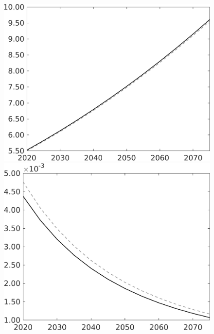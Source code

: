 \documentclass[12pt]{article}
\begin{document}
\begin{figure}[h!!]
\begin{minipage}[]{0.32\textwidth}
	\end{minipage}	
	\begin{minipage}[]{0.32\textwidth}
		\includegraphics[width=1\textwidth]{../../codding_model/own_basedOnFried/optimalPol_010922_revision/figures/all_13Sept22/CompTaul_Equlab_LFBAU_Reg0_pgpftf_spillover0_nsk0_xgr0_knspil1_sep1_countec0_GovRev0_etaa0.79_lgd0.png}
	\end{minipage}	
	\begin{minipage}[]{0.32\textwidth}
		\includegraphics[width=1\textwidth]{../../codding_model/own_basedOnFried/optimalPol_010922_revision/figures/all_13Sept22/CompTaul_Equlab_LFBAU_Reg0_Lf_spillover0_nsk0_xgr0_knspil1_sep1_countec0_GovRev0_etaa0.79_lgd0.png}

\end{minipage}
\end{figure}
\end{document}
